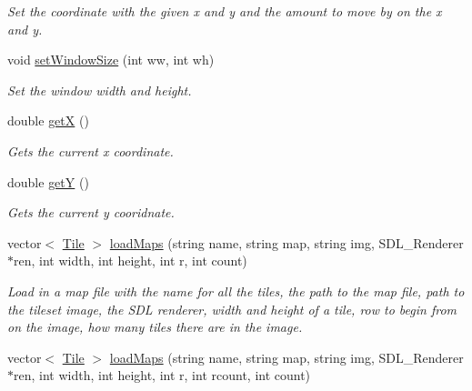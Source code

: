\begin{DoxyCompactItemize}
\begin{DoxyCompactList}\small\item\em Set the coordinate with the given x and y and the amount to move by on the x and y. \end{DoxyCompactList}\item 
void \hyperlink{classTilesettmp_aacf8d226f112ce839c1a6bf6e5880cef}{set\+Window\+Size} (int ww, int wh)\hypertarget{classTilesettmp_aacf8d226f112ce839c1a6bf6e5880cef}{}\label{classTilesettmp_aacf8d226f112ce839c1a6bf6e5880cef}

\begin{DoxyCompactList}\small\item\em Set the window width and height. \end{DoxyCompactList}\item 
double \hyperlink{classTilesettmp_aa9531a25332912d5a14654c0f2b3d3cc}{getX} ()\hypertarget{classTilesettmp_aa9531a25332912d5a14654c0f2b3d3cc}{}\label{classTilesettmp_aa9531a25332912d5a14654c0f2b3d3cc}

\begin{DoxyCompactList}\small\item\em Gets the current x coordinate. \end{DoxyCompactList}\item 
double \hyperlink{classTilesettmp_a18081095d017d017e20bf8a6887d707b}{getY} ()\hypertarget{classTilesettmp_a18081095d017d017e20bf8a6887d707b}{}\label{classTilesettmp_a18081095d017d017e20bf8a6887d707b}

\begin{DoxyCompactList}\small\item\em Gets the current y cooridnate. \end{DoxyCompactList}\item 
vector$<$ \hyperlink{classTile}{Tile} $>$ \hyperlink{classTilesettmp_a0f49689627986c24ab42df047d38d45b}{load\+Maps} (string name, string map, string img, S\+D\+L\+\_\+\+Renderer $\ast$ren, int width, int height, int r, int count)\hypertarget{classTilesettmp_a0f49689627986c24ab42df047d38d45b}{}\label{classTilesettmp_a0f49689627986c24ab42df047d38d45b}

\begin{DoxyCompactList}\small\item\em Load in a map file with the name for all the tiles, the path to the map file, path to the tileset image, the S\+DL renderer, width and height of a tile, row to begin from on the image, how many tiles there are in the image. \end{DoxyCompactList}\item 
vector$<$ \hyperlink{classTile}{Tile} $>$ \hyperlink{classTilesettmp_a58cb657abeac1bebaee3539639903825}{load\+Maps} (string name, string map, string img, S\+D\+L\+\_\+\+Renderer $\ast$ren, int width, int height, int r, int rcount, int count)\hypertarget{classTilesettmp_a58cb657abeac1bebaee3539639903825}{}\label{classTilesettmp_a58cb657abeac1bebaee3539639903825}


\end{DoxyCompactItemize}
